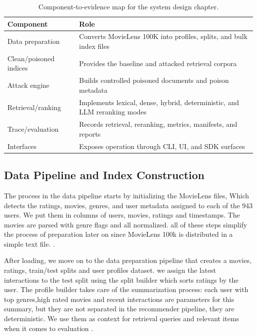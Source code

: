 \begin{table}[H]
\centering
\small
\setlength{\tabcolsep}{8pt}
\caption{Component-to-evidence map for the system design chapter.}
\label{tab:component-evidence-map}
\begin{tabular}{p{}p{}}
\toprule
Component & Role \\
\midrule
Data preparation & Converts MovieLens 100K into profiles, splits, and bulk index files \\
Clean/poisoned indices & Provides the baseline and attacked retrieval corpora \\
Attack engine & Builds controlled poisoned documents and poison metadata \\
Retrieval/ranking & Implements lexical, dense, hybrid, deterministic, and LLM reranking modes \\
Trace/evaluation & Records retrieval, reranking, metrics, manifests, and reports \\
Interfaces & Exposes operation through CLI, UI, and SDK surfaces \\
\bottomrule
\end{tabular}
\end{table}

\subsection{Data Pipeline and Index Construction}

The process in the data pipeline starts by initializing the MovieLens files, Which detects the ratings, movies, genres, and user metadata assigned to each of the 943 users. We put them in columns of users, movies, ratings and timestamps. The movies are parsed with genre flags and all normalized. all of these steps simplify the process of preparation later on since MovieLens 100k is distributed in a simple text file. \cite{harper2015movielens,ragpoisonlab_repo}.

After loading, we move on to the data preparation pipeline that creates a movies, ratings, train/test splits and user profiles dataset. we assign the latest interactions to the test split using the split builder which sorts ratings by the user. The profile builder takes care of the summarization process: each user with top genres,high rated movies and recent interactions are parameters for this summary, but they are not separated in the recommender pipeline, they are deterministic. We use them as context for retrieval queries and relevant items when it comes to evaluation \cite{ragpoisonlab_repo}.

